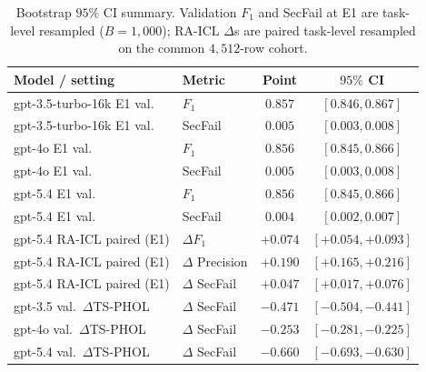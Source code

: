 \documentclass[10pt,a4paper,twocolumn]{article}
\begin{document}
\begin{table}[H]
\centering
\caption{Bootstrap $95\%$ CI summary. Validation $F_1$ and SecFail at E1 are task-level resampled ($B=1{,}000$); RA-ICL $\Delta$s are paired task-level resampled on the common $4{,}512$-row cohort.}
\label{tab:bootstrap_summary}
\small
\setlength{\tabcolsep}{4pt}
\begin{tabular}{@{}llcc@{}}
\toprule
\textbf{Model / setting} & \textbf{Metric} & \textbf{Point} & \textbf{$95\%$ CI} \\
\midrule
gpt-3.5-turbo-16k E1 val. & $F_1$    & $0.857$ & $[0.846, 0.867]$ \\
gpt-3.5-turbo-16k E1 val. & SecFail  & $0.005$ & $[0.003, 0.008]$ \\
gpt-4o E1 val.            & $F_1$    & $0.856$ & $[0.845, 0.866]$ \\
gpt-4o E1 val.            & SecFail  & $0.005$ & $[0.003, 0.008]$ \\
gpt-5.4 E1 val.           & $F_1$    & $0.856$ & $[0.845, 0.866]$ \\
gpt-5.4 E1 val.           & SecFail  & $0.004$ & $[0.002, 0.007]$ \\
\midrule
gpt-5.4 RA-ICL paired (E1) & $\Delta F_1$ & $+0.074$ & $[+0.054, +0.093]$ \\
gpt-5.4 RA-ICL paired (E1) & $\Delta$ Precision & $+0.190$ & $[+0.165, +0.216]$ \\
gpt-5.4 RA-ICL paired (E1) & $\Delta$ SecFail   & $+0.047$ & $[+0.017, +0.076]$ \\
\midrule
gpt-3.5 val.\ $\Delta$TS-PHOL & $\Delta$ SecFail & $-0.471$ & $[-0.504, -0.441]$ \\
gpt-4o  val.\ $\Delta$TS-PHOL & $\Delta$ SecFail & $-0.253$ & $[-0.281, -0.225]$ \\
gpt-5.4 val.\ $\Delta$TS-PHOL & $\Delta$ SecFail & $-0.660$ & $[-0.693, -0.630]$ \\
\bottomrule
\end{tabular}
\end{table}
\end{document}
